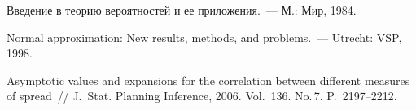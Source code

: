 \begin{multicols}{2}
{{\begin{thebibliography}{99}
 Введение в теорию вероятностей и ее приложения.~--- М.: Мир, 1984.

 Normal approximation: New results,
methods, and problems.~--- Utrecht: VSP, 1998.

\label{end\stat}

 Asymptotic values and expansions for the correlation 
between different measures of spread~// J.~Stat. Planning Inference, 2006. Vol.~136. 
No.\,7. P.~2197--2212.
 \end{thebibliography}
}
}


\end{multicols}